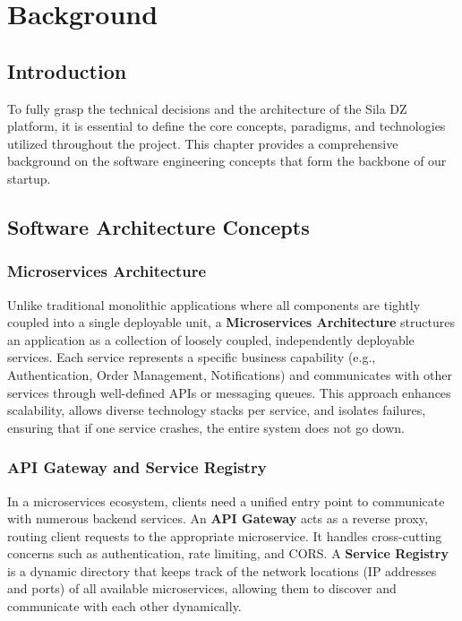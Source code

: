 \chapter{Background}

\section{Introduction}
To fully grasp the technical decisions and the architecture of the Sila DZ platform, it is essential to define the core concepts, paradigms, and technologies utilized throughout the project. This chapter provides a comprehensive background on the software engineering concepts that form the backbone of our startup.

\section{Software Architecture Concepts}

\subsection{Microservices Architecture}
Unlike traditional monolithic applications where all components are tightly coupled into a single deployable unit, a \textbf{Microservices Architecture} structures an application as a collection of loosely coupled, independently deployable services. Each service represents a specific business capability (e.g., Authentication, Order Management, Notifications) and communicates with other services through well-defined APIs or messaging queues. This approach enhances scalability, allows diverse technology stacks per service, and isolates failures, ensuring that if one service crashes, the entire system does not go down.

\subsection{API Gateway and Service Registry}
In a microservices ecosystem, clients need a unified entry point to communicate with numerous backend services. An \textbf{API Gateway} acts as a reverse proxy, routing client requests to the appropriate microservice. It handles cross-cutting concerns such as authentication, rate limiting, and CORS. A \textbf{Service Registry} is a dynamic directory that keeps track of the network locations (IP addresses and ports) of all available microservices, allowing them to discover and communicate with each other dynamically.

